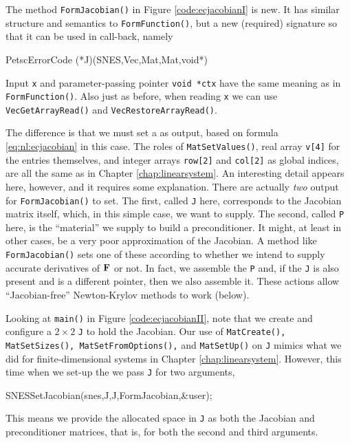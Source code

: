 
The method \texttt{FormJacobian()} in Figure \ref{code:ecjacobianI} is new.  It has similar structure and semantics to \texttt{FormFunction()}, but a new (required) signature so that it can be used in call-back, namely
\begin{code}
PetscErrorCode (*J)(SNES,Vec,Mat,Mat,void*)
\end{code}
Input \pVec \texttt{x} and parameter-passing pointer \texttt{void *ctx} have the same meaning as in \texttt{FormFunction()}.  Also just as before, when reading \texttt{x} we can use \texttt{VecGetArrayRead()} and \texttt{VecRestoreArrayRead()}.


The difference is that we must set a \pMat as output, based on formula \eqref{eq:nl:ecjacobian} in this case.  The roles of \texttt{MatSetValues()}, real array \texttt{v[4]} for the entries themselves, and integer arrays \texttt{row[2]} and \texttt{col[2]} as global indices, are all the same as in Chapter \ref{chap:linearsystem}.  An interesting detail appears here, however, and it requires some explanation.  There are actually \emph{two} output \pMats for \texttt{FormJacobian()} to set.  The first, called \texttt{J} here, corresponds to the Jacobian matrix itself, which, in this simple case, we want to supply.  The second, called \texttt{P} here, is the ``material'' we supply to build a preconditioner.  It might, at least in other cases, be a very poor approximation of the Jacobian.  A method like \texttt{FormJacobian()} sets one of these \pMats according to whether we intend to supply accurate derivatives of $\mathbf{F}$ or not.  In fact, we assemble the \pMat \texttt{P} and, if the \pMat \texttt{J} is also present and is a different pointer, then we also assemble it.  These actions allow ``Jacobian-free'' Newton-Krylov methods to work (below).

Looking at \texttt{main()} in Figure \ref{code:ecjacobianII}, note that we create and configure a $2\times 2$ \pMat \texttt{J} to hold the Jacobian.  Our use of \texttt{MatCreate(), MatSetSizes(), MatSetFromOptions(),} and \texttt{MatSetUp()} on \texttt{J} mimics what we did for finite-dimensional systems in Chapter \ref{chap:linearsystem}.  However, this time when we set-up the \pSNES we pass \texttt{J} for two arguments,
\begin{code}
SNESSetJacobian(snes,J,J,FormJacobian,&user);
\end{code}
This means we provide the allocated space in \texttt{J} as both the Jacobian and preconditioner matrices, that is, for both the second and third \pMat arguments.

